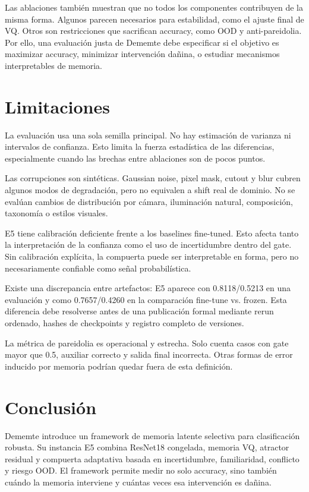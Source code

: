 \documentclass[11pt,a4paper]{article}
\begin{document}
Las ablaciones también muestran que no todos los componentes contribuyen de la
misma forma. Algunos parecen necesarios para estabilidad, como el ajuste final de
VQ. Otros son restricciones que sacrifican accuracy, como OOD y anti-pareidolia.
Por ello, una evaluación justa de Dememte debe especificar si el objetivo es
maximizar accuracy, minimizar intervención dañina, o estudiar mecanismos
interpretables de memoria.

\section{Limitaciones}

La evaluación usa una sola semilla principal. No hay estimación de varianza ni
intervalos de confianza. Esto limita la fuerza estadística de las diferencias,
especialmente cuando las brechas entre ablaciones son de pocos puntos.

Las corrupciones son sintéticas. Gaussian noise, pixel mask, cutout y blur cubren
algunos modos de degradación, pero no equivalen a shift real de dominio. No se
evalúan cambios de distribución por cámara, iluminación natural, composición,
taxonomía o estilos visuales.

E5 tiene calibración deficiente frente a los baselines fine-tuned. Esto afecta
tanto la interpretación de la confianza como el uso de incertidumbre dentro del
gate. Sin calibración explícita, la compuerta puede ser interpretable en forma,
pero no necesariamente confiable como señal probabilística.

Existe una discrepancia entre artefactos: E5 aparece con 0.8118/0.5213 en una
evaluación y como 0.7657/0.4260 en la comparación fine-tune vs. frozen. Esta
diferencia debe resolverse antes de una publicación formal mediante rerun
ordenado, hashes de checkpoints y registro completo de versiones.

La métrica de pareidolia es operacional y estrecha. Solo cuenta casos con gate
mayor que 0.5, auxiliar correcto y salida final incorrecta. Otras formas de error
inducido por memoria podrían quedar fuera de esta definición.

\section{Conclusión}

Dememte introduce un framework de memoria latente selectiva para clasificación
robusta. Su instancia E5 combina ResNet18 congelada, memoria VQ, atractor
residual y compuerta adaptativa basada en incertidumbre, familiaridad, conflicto
y riesgo OOD. El framework permite medir no solo accuracy, sino también cuándo
la memoria interviene y cuántas veces esa intervención es dañina.
\end{document}

